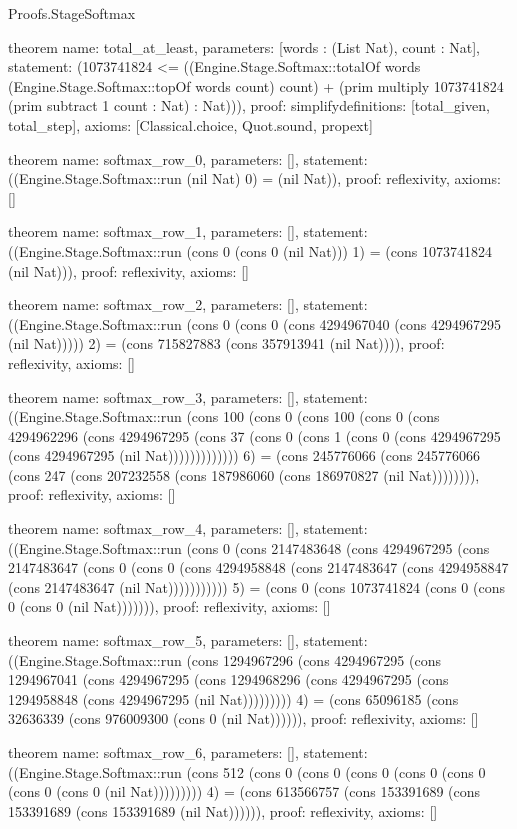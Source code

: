 \begin{lexlean}{Proofs.StageSoftmax}
\begin{semanticmodule}
theorem{
  name: total_at_least,
  parameters: [words : (List Nat), count : Nat],
  statement: (1073741824 <= ((Engine.Stage.Softmax::totalOf words (Engine.Stage.Softmax::topOf words count) count) + (prim multiply 1073741824 (prim subtract 1 count : Nat) : Nat))),
  proof: simplify{definitions: [total_given, total_step]},
  axioms: [Classical.choice, Quot.sound, propext]
}

theorem{
  name: softmax_row_0,
  parameters: [],
  statement: ((Engine.Stage.Softmax::run (nil Nat) 0) = (nil Nat)),
  proof: reflexivity{},
  axioms: []
}

theorem{
  name: softmax_row_1,
  parameters: [],
  statement: ((Engine.Stage.Softmax::run (cons 0 (cons 0 (nil Nat))) 1) = (cons 1073741824 (nil Nat))),
  proof: reflexivity{},
  axioms: []
}

theorem{
  name: softmax_row_2,
  parameters: [],
  statement: ((Engine.Stage.Softmax::run (cons 0 (cons 0 (cons 4294967040 (cons 4294967295 (nil Nat))))) 2) = (cons 715827883 (cons 357913941 (nil Nat)))),
  proof: reflexivity{},
  axioms: []
}

theorem{
  name: softmax_row_3,
  parameters: [],
  statement: ((Engine.Stage.Softmax::run (cons 100 (cons 0 (cons 100 (cons 0 (cons 4294962296 (cons 4294967295 (cons 37 (cons 0 (cons 1 (cons 0 (cons 4294967295 (cons 4294967295 (nil Nat))))))))))))) 6) = (cons 245776066 (cons 245776066 (cons 247 (cons 207232558 (cons 187986060 (cons 186970827 (nil Nat)))))))),
  proof: reflexivity{},
  axioms: []
}

theorem{
  name: softmax_row_4,
  parameters: [],
  statement: ((Engine.Stage.Softmax::run (cons 0 (cons 2147483648 (cons 4294967295 (cons 2147483647 (cons 0 (cons 0 (cons 4294958848 (cons 2147483647 (cons 4294958847 (cons 2147483647 (nil Nat))))))))))) 5) = (cons 0 (cons 1073741824 (cons 0 (cons 0 (cons 0 (nil Nat))))))),
  proof: reflexivity{},
  axioms: []
}

theorem{
  name: softmax_row_5,
  parameters: [],
  statement: ((Engine.Stage.Softmax::run (cons 1294967296 (cons 4294967295 (cons 1294967041 (cons 4294967295 (cons 1294968296 (cons 4294967295 (cons 1294958848 (cons 4294967295 (nil Nat))))))))) 4) = (cons 65096185 (cons 32636339 (cons 976009300 (cons 0 (nil Nat)))))),
  proof: reflexivity{},
  axioms: []
}

theorem{
  name: softmax_row_6,
  parameters: [],
  statement: ((Engine.Stage.Softmax::run (cons 512 (cons 0 (cons 0 (cons 0 (cons 0 (cons 0 (cons 0 (cons 0 (nil Nat))))))))) 4) = (cons 613566757 (cons 153391689 (cons 153391689 (cons 153391689 (nil Nat)))))),
  proof: reflexivity{},
  axioms: []
}


\end{semanticmodule}
\end{lexlean}
